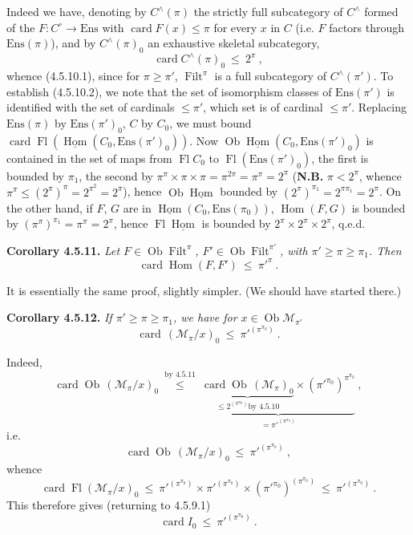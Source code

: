 \documentclass[11pt]{article}
\newcommand{\printedpage}[1]{\marginpar{\footnotesize p.~#1}}
\newcommand{\msp}[1]{\marginpar{\footnotesize [#1]}}
\newcommand{\Filt}{\operatorname{Filt}}
\newcommand{\Ob}{\operatorname{Ob}}
\newcommand{\card}{\operatorname{card}}
\newcommand{\Fl}{\operatorname{Fl}}
\newcommand{\Hom}{\operatorname{Hom}}
\newcommand{\uHom}{\underline{\operatorname{Hom}}}
\newcommand{\Ens}{\mathrm{Ens}}
\begin{document}
Indeed we have, denoting by $C^\wedge(\pi)$ the strictly full subcategory of $C^\wedge$ formed of the $F : C^\circ \longrightarrow \Ens$ with $\card F(x) \leqslant \pi$ for every $x$ in $C$ (i.e. $F$ factors through $\Ens(\pi)$), and by $C^\wedge(\pi)_0$ an
\printedpage{37}
\msp{page 123}
exhaustive skeletal subcategory,
\[
\card C^\wedge(\pi)_0 \ \leqslant \ 2^\pi \ , \tag*{(4.5.10.2)}
\]
whence (4.5.10.1), since for $\pi \geqslant \pi'$, $\Filt^\pi$ is a full subcategory of $C^\wedge(\pi')$. To establish (4.5.10.2), we note that the set of isomorphism classes of $\Ens(\pi')$ is identified with the set of cardinals $\leqslant \pi'$, which set is of cardinal $\leqslant \pi'$. Replacing $\Ens(\pi)$ by $\Ens(\pi')_0$, $C$ by $C_0$, we must bound $\card \Fl(\uHom(C_0, \Ens(\pi')_0))$. Now $\Ob \uHom(C_0, \Ens(\pi')_0)$ is contained in the set of maps from $\Fl C_0$ to $\Fl(\Ens(\pi')_0)$, the first is bounded by $\pi_1$, the second by $\pi^\pi \times \pi \times \pi = \pi^{2\pi} = \pi^\pi = 2^\pi$ (\textbf{N.B.} $\pi < 2^\pi$, whence $\pi^\pi \leqslant (2^\pi)^\pi = 2^{\pi^2} = 2^\pi$), hence $\Ob \uHom$ bounded by $(2^\pi)^{\pi_1} = 2^{\pi\pi_1} = 2^\pi$. On the other hand, if $F$, $G$ are in $\uHom(C_0, \Ens(\pi_0))$, $\Hom(F,G)$ is bounded by $(\pi^\pi)^{\pi_1} = \pi^\pi = 2^\pi$, hence $\Fl \uHom$ is bounded by $2^\pi \times 2^\pi \times 2^\pi$, q.e.d.

\textbf{Corollary 4.5.11.} \textit{Let $F \in \Ob \Filt^\pi$, $F' \in \Ob \Filt^{\pi'}$, with $\pi' \geqslant \pi \geqslant \pi_1$. Then}
\[
\card \Hom(F, F') \ \leqslant \ \pi'^{\pi} \ . \tag*{(4.5.11.1)}
\]

\msp{page 124}

It is essentially the same proof, slightly simpler. (We should have started there.)

\textbf{Corollary 4.5.12.} \textit{If $\pi' \geqslant \pi \geqslant \pi_1$, we have for $x \in \Ob \mathcal{M}_{\pi'}$}
\[
\card\,(\mathcal{M}_\pi/x)_0 \ \leqslant \ \pi'^{(\pi^{\pi_0})} \ . \tag*{(4.5.12)}
\]

Indeed,
\[
\card \Ob\,(\mathcal{M}_\pi/x)_0 \ \overset{\text{by 4.5.11}}{\leqslant} \ \underbrace{\underbrace{\card \Ob\,(\mathcal{M}_\pi)_0}_{\leqslant 2^{(\pi^{\pi_0})} \text{by 4.5.10}} \times (\pi'^{\pi_0})^{\pi^{\pi_0}}}_{= \pi'^{(\pi^{\pi_0})}} \ ,
\]
i.e.
\[
\card \Ob\,(\mathcal{M}_\pi/x)_0 \ \leqslant \ \pi'^{(\pi^{\pi_0})} \ ,
\]
whence
\[
\card \Fl(\mathcal{M}_\pi/x)_0 \ \leqslant \ \pi'^{(\pi^{\pi_0})} \times \pi'^{(\pi^{\pi_0})} \times (\pi'^{\pi_0})^{(\pi^{\pi_0})} \ \leqslant \ \pi'^{(\pi^{\pi_0})} \ .
\]
This therefore gives (returning to 4.5.9.1)
\[
\card I_0 \ \leqslant \ \pi'^{(\pi^{\pi_0})} \ .
\]
\end{document}
